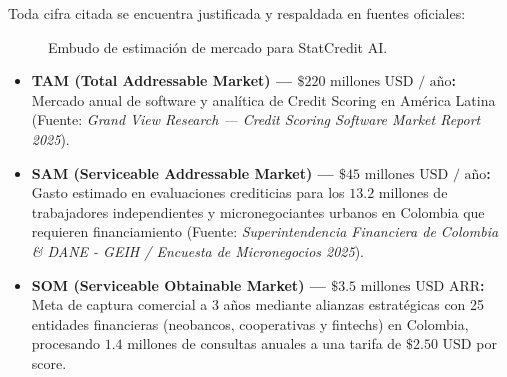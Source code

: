 \documentclass[11pt,a4paper]{article}
\begin{document}
Toda cifra citada se encuentra justificada y respaldada en fuentes oficiales:

\begin{figure}[h!]
\centering
\small
{}
\caption{Embudo de estimación de mercado para StatCredit AI.}
\end{figure}

\begin{itemize}[leftmargin=*]
    \item \textbf{TAM (Total Addressable Market) --- $\$220\text{ millones USD / año}$:} Mercado anual de software y analítica de Credit Scoring en América Latina (Fuente: \textit{Grand View Research --- Credit Scoring Software Market Report 2025}).
    \item \textbf{SAM (Serviceable Addressable Market) --- $\$45\text{ millones USD / año}$:} Gasto estimado en evaluaciones crediticias para los $13.2$ millones de trabajadores independientes y micronegociantes urbanos en Colombia que requieren financiamiento (Fuente: \textit{Superintendencia Financiera de Colombia \& DANE - GEIH / Encuesta de Micronegocios 2025}).
    \item \textbf{SOM (Serviceable Obtainable Market) --- $\$3.5\text{ millones USD ARR}$:} Meta de captura comercial a 3 años mediante alianzas estratégicas con 25 entidades financieras (neobancos, cooperativas y fintechs) en Colombia, procesando $1.4$ millones de consultas anuales a una tarifa de $\$2.50\text{ USD}$ por score.
\end{itemize}
\end{document}
